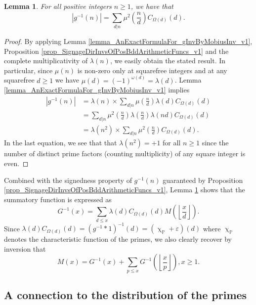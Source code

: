 \documentclass[11pt,reqno,a4letter]{article}
\numberwithin{figure}{section}
\numberwithin{table}{section}
\renewcommand{\chi}{\upchi}
\newcommand{\Floor}[2]{\ensuremath{\left\lfloor \frac{#1}{#2} \right\rfloor}}
\theoremstyle{plain}
\newtheorem{lemma}[theorem]{Lemma}
\numberwithin{theorem}{section}
\theoremstyle{definition}
\begin{document}
\begin{lemma} 
\label{lemma_AbsValueOf_gInvn_FornSquareFree_v1} 
For all positive integers $n \geq 1$, we have that 
\begin{equation} 
\label{eqn_AbsValueOf_gInvn_FornSquareFree_v1} 
|g^{-1}(n)| = \sum_{d|n} \mu^2\left(\frac{n}{d}\right) C_{\Omega(d)}(d). 
\end{equation} 
\end{lemma} 
\begin{proof} 
By applying 
Lemma \ref{lemma_AnExactFormulaFor_gInvByMobiusInv_v1}, 
Proposition \ref{prop_SignageDirInvsOfPosBddArithmeticFuncs_v1} and the 
complete multiplicativity of $\lambda(n)$, 
we easily obtain the stated result. 
In particular, since $\mu(n)$ is non-zero only at squarefree integers and 
at any squarefree $d \geq 1$ we have $\mu(d) = (-1)^{\omega(d)} = \lambda(d)$. 
Lemma \ref{lemma_AnExactFormulaFor_gInvByMobiusInv_v1} implies 
\begin{align*} 
|g^{-1}(n)| & = \lambda(n) \times \sum_{d|n} \mu\left(\frac{n}{d}\right) \lambda(d) C_{\Omega(d)}(d) \\ 
     & = \sum_{d|n} \mu^2\left(\frac{n}{d}\right) \lambda\left(\frac{n}{d}\right) 
     \lambda(nd) C_{\Omega(d)}(d) \\ 
     & = \lambda(n^2) \times \sum_{d|n} \mu^2\left(\frac{n}{d}\right) C_{\Omega(d)}(d). 
\end{align*} 
In the last equation, we see that 
that $\lambda(n^2) = +1$ for all $n \geq 1$ since the number of distinct 
prime factors (counting multiplicity) of any square integer is even. 
\end{proof} 

Combined with the signedness property of $g^{-1}(n)$ guaranteed by 
Proposition \ref{prop_SignageDirInvsOfPosBddArithmeticFuncs_v1}, 
Lemma \ref{lemma_AbsValueOf_gInvn_FornSquareFree_v1} shows that the summatory 
function is expressed as 
\[
G^{-1}(x) = \sum_{d \leq x} \lambda(d) C_{\Omega(d)}(d) M\left(\Floor{x}{d}\right). 
\]
Since $\lambda(d) C_{\Omega(d)}(d) = (g^{-1} \ast 1)^{-1}(d) = (\chi_{\mathbb{P}} + \varepsilon)(d)$ 
where $\chi_{\mathbb{P}}$ denotes the characteristic function of the primes, we also clearly 
recover by inversion that 
\[
M(x) = G^{-1}(x) + \sum_{p \leq x} G^{-1}\left(\Floor{x}{p}\right), x \geq 1. 
\]

\subsection{A connection to the distribution of the primes} 
\end{document}
